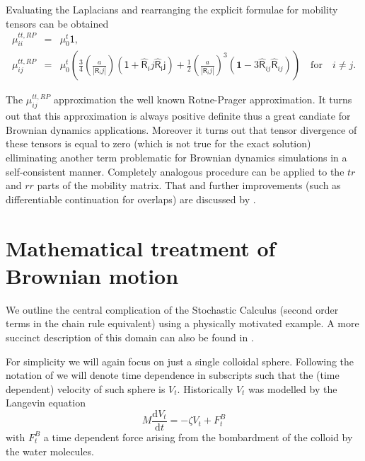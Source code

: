 \documentclass{doctoral}
\newcommand{\dd}{\mathrm{d}}
\newcommand{\mm}[1]{\bm{\mathsf{#1}}} %
\begin{document}
Evaluating the Laplacians and rearranging the explicit formulae for mobility tensors can be obtained
\begin{eqnarray}
    \mm{\mu}_{ii}^{tt,RP} & = & \mu_0^t \mm{1},                                                                                                                                                                                                                                                                     \\
    \mm{\mu}_{ij}^{tt,RP} & = & \mu_0^t \left( \frac{3}{4} \left( \frac{a}{|\mm{R}_ij|} \right) \left( \mm{1} + \mm{\hat{R}}_ij\mm{\hat{R}_ij} \right) + \frac{1}{2} \left( \frac{a}{|\mm{R}_ij|} \right)^3 \left( \bm{1} -3  \mm{\hat{R}}_{ij}\mm{\hat{R}}_{ij} \right) \right) \quad \mathrm{for} \quad i \neq j.
    \label{eqn:rotne-prager-translation}
\end{eqnarray}

The $\mm{\mu}_{ij}^{tt,RP}$ approximation the well known Rotne-Prager approximation\cite{Nagele_2013,Dhont_2008,Kim_2013}.
It turns out that this approximation is always positive definite thus a great candiate for Brownian dynamics applications.
Moreover it turns out that tensor divergence of these tensors is equal to zero (which is not true for the exact solution) elliminating another term problematic for Brownian dynamics simulations in a self-consistent manner.
Completely analogous procedure can be applied to the $tr$ and $rr$ parts of the mobility matrix.
That and further improvements (such as differentiable continuation for overlaps) are discussed by \textcite{Zuk_2018}.

\section{Mathematical treatment of Brownian motion}
\label{sec:SDE}

We outline the central complication of the Stochastic Calculus (second order terms in the chain rule equivalent) using a physically motivated example.
A more succinct description of this domain can also be found in \textcite{Waszkiewicz_2023_pychastic}.

For simplicity we will again focus on just a single colloidal sphere.
Following the notation of \textcite{Ottinger_2012} we will denote time dependence in subscripts such that the (time dependent) velocity of such sphere is $V_t$.
Historically $V_t$ was modelled by the Langevin equation
\begin{equation}
    M \frac{\dd V_t}{\dd t} = - \zeta V_t + F^{B}_t \label{eqn:langevin-velocity}
\end{equation}
with $F^B_t$ a time dependent force arising from the bombardment of the colloid by the water molecules.
\end{document}
